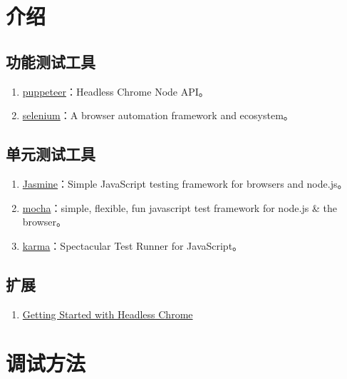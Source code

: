 \section{介绍}\label{ux4ecbux7ecd}

\subsection{功能测试工具}\label{ux529fux80fdux6d4bux8bd5ux5de5ux5177}

\begin{enumerate}
\def\labelenumi{\arabic{enumi}.}
\tightlist
\item
  \href{https://github.com/GoogleChrome/puppeteer}{puppeteer}：Headless
  Chrome Node API。
\item
  \href{https://github.com/SeleniumHQ/selenium}{selenium}：A browser
  automation framework and ecosystem。
\end{enumerate}

\subsection{单元测试工具}\label{ux5355ux5143ux6d4bux8bd5ux5de5ux5177}

\begin{enumerate}
\def\labelenumi{\arabic{enumi}.}
\tightlist
\item
  \href{https://github.com/jasmine/jasmine}{Jasmine}：Simple JavaScript
  testing framework for browsers and node.js。
\item
  \href{https://github.com/mochajs/mocha}{mocha}：simple, flexible, fun
  javascript test framework for node.js \& the browser。
\item
  \href{https://github.com/karma-runner/karma}{karma}：Spectacular Test
  Runner for JavaScript。
\end{enumerate}

\subsection{扩展}\label{ux6269ux5c55}

\begin{enumerate}
\def\labelenumi{\arabic{enumi}.}
\tightlist
\item
  \href{https://developers.google.cn/web/updates/2017/04/headless-chrome}{Getting
  Started with Headless Chrome}
\end{enumerate}

\section{调试方法}\label{ux8c03ux8bd5ux65b9ux6cd5}

